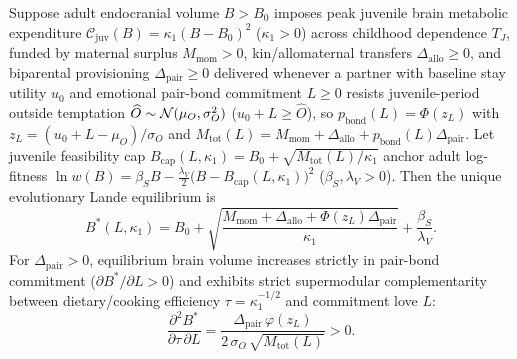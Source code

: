 \begin{proposition}\label{prop:childhood}
Suppose adult endocranial volume $B>B_0$ imposes peak juvenile brain metabolic expenditure $\mathcal{C}_{\mathrm{juv}}(B)=\kappa_1(B-B_0)^2$ ($\kappa_1>0$) across childhood dependence $T_J$, funded by maternal surplus $M_{\mathrm{mom}}>0$, kin/allomaternal transfers $\Delta_{\mathrm{allo}}\ge 0$, and biparental provisioning $\Delta_{\mathrm{pair}}\ge 0$ delivered whenever a partner with baseline stay utility $u_0$ and emotional pair-bond commitment $L\ge 0$ resists juvenile-period outside temptation $\widehat{O}\sim\mathcal{N}(\mu_O,\sigma_O^2)$ ($u_0+L\ge\widehat{O}$), so $p_{\mathrm{bond}}(L)=\Phi(z_L)$ with $z_L=(u_0+L-\mu_O)/\sigma_O$ and $M_{\mathrm{tot}}(L)=M_{\mathrm{mom}}+\Delta_{\mathrm{allo}}+p_{\mathrm{bond}}(L)\Delta_{\mathrm{pair}}$. Let juvenile feasibility cap $B_{\mathrm{cap}}(L,\kappa_1)=B_0+\sqrt{M_{\mathrm{tot}}(L)/\kappa_1}$ anchor adult log-fitness $\ln w(B)=\beta_S B-\tfrac{\lambda_V}{2}\big(B-B_{\mathrm{cap}}(L,\kappa_1)\big)^2$ ($\beta_S,\lambda_V>0$). Then the unique evolutionary Lande equilibrium is
\begin{equation}
B^*(L,\kappa_1)=B_0+\sqrt{\frac{M_{\mathrm{mom}}+\Delta_{\mathrm{allo}}+\Phi(z_L)\Delta_{\mathrm{pair}}}{\kappa_1}}+\frac{\beta_S}{\lambda_V}.\label{eq:childhood}
\end{equation}
For $\Delta_{\mathrm{pair}}>0$, equilibrium brain volume increases strictly in pair-bond commitment ($\partial B^*/\partial L>0$) and exhibits strict supermodular complementarity between dietary/cooking efficiency $\tau=\kappa_1^{-1/2}$ and commitment love $L$:
\begin{equation}
\frac{\partial^2 B^*}{\partial\tau\,\partial L}=\frac{\Delta_{\mathrm{pair}}\,\varphi(z_L)}{2\,\sigma_O\,\sqrt{M_{\mathrm{tot}}(L)}}>0.\label{eq:childcomp}
\end{equation}
\end{proposition}

